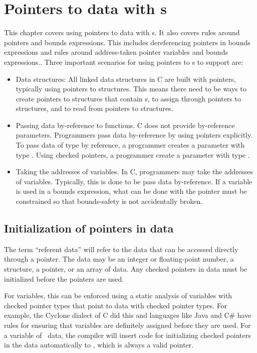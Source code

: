 
\chapter{Pointers  to data with \plainarrayptr s}
\label{chapter:pointers-to-data-with-arrayptrs}

This chapter covers using pointers to data with \arrayptr s.  It also covers rules
around pointers and bounds expressions.  This includes dereferencing pointers
in bounds expressions and rules around address-taken pointer variables and
bounds expressions..
Three important scenarios for using pointers to \arrayptr s to support are:
\begin{itemize}
\item Data structures: All linked data structures in 
C are built with pointers, typically using pointers to structures.   This means
there need to be ways to create pointers to structures that contain \arrayptr s,
to assign through pointers to structures, and to read from pointers to structures.
\item Passing data by-reference to functions.  C does not provide by-reference
parameters.  Programmers pass data by-reference by using pointers explicitly.
To pass data of type  by reference, a programmer creates a parameter
with type .  Using checked pointers, a programmer create a parameter
with type \ptrT.
\item Taking the addresses of variables.  In C, programmers may take the
addresses of variables.  Typically, this is done to be pass data by-reference.
If a variable is used in a bounds expression, what can be done with the pointer
must be constrained so that bounds-safety is not accidentally broken.
\end{itemize}

\section{Initialization of pointers in data}

The term ``referent data'' will refer to the data that can be accessed
directly through a pointer.  The data may be an integer or floating-point number, a structure,
a pointer, or an array of data.   Any checked pointers in data must be initialized
before the pointers are used.

For variables, this can be enforced using a static 
analysis of variables with checked pointer types that point to data with checked
pointer types. For example, the Cyclone dialect of C \cite{Jim2002} did this
and languages like Java and C\# have rules for ensuring that variables
are definitely assigned before they are used.
For a variable of \arrayptr\ data, the compiler will insert code for 
initializing checked pointers in the data automatically to , which is always
a valid pointer.    

